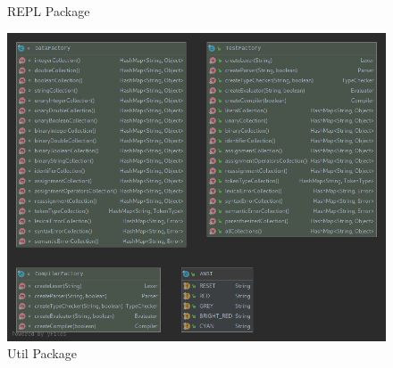 \documentclass[
]{report}
\begin{document}
\begin{appendices}
\begin{figure}
		\caption{REPL Package}
		\label{fig:repl-package-diagram}
	\end{figure}
	\begin{figure}
		\centering
		\includegraphics[width=\textwidth]{util-package-diagram}
		\caption{Util Package}
		\label{fig:util-package-diagram}
	\end{figure}


\end{appendices}
\end{document}

